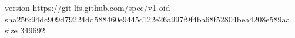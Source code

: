version https://git-lfs.github.com/spec/v1
oid sha256:94dc909d79224dd588460e9445c122e26a997f9f4ba68f52804bea4208e589aa
size 349692

